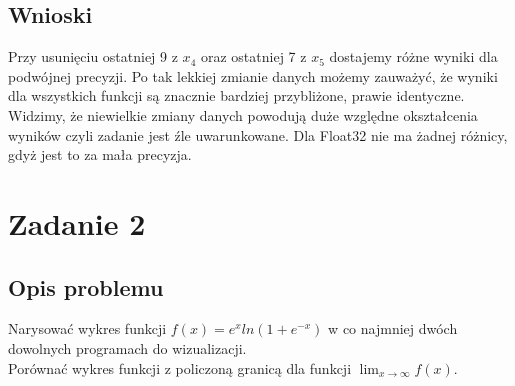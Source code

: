 \documentclass{article}
\begin{document}
\subsection*{Wnioski}
	Przy usunięciu ostatniej 9 z $x_4$ oraz ostatniej 7 z $x_5$ dostajemy różne wyniki dla podwójnej precyzji.
	Po tak lekkiej zmianie danych możemy zauważyć, że wyniki dla wszystkich funkcji są znacznie bardziej przybliżone, prawie identyczne.
	Widzimy, że niewielkie zmiany danych powodują duże względne okształcenia wyników czyli zadanie jest źle uwarunkowane.
	Dla Float32 nie ma żadnej różnicy, gdyż jest to za mała precyzja.

\section*{Zadanie 2}
\subsection*{Opis problemu}
	Narysować wykres funkcji $f(x) = e^xln(1 + e^{-x})$ w co najmniej dwóch dowolnych programach do wizualizacji. \\
	Porównać wykres funkcji z policzoną granicą dla funkcji $\lim_{x\to\infty}f(x)$.
\end{document}
